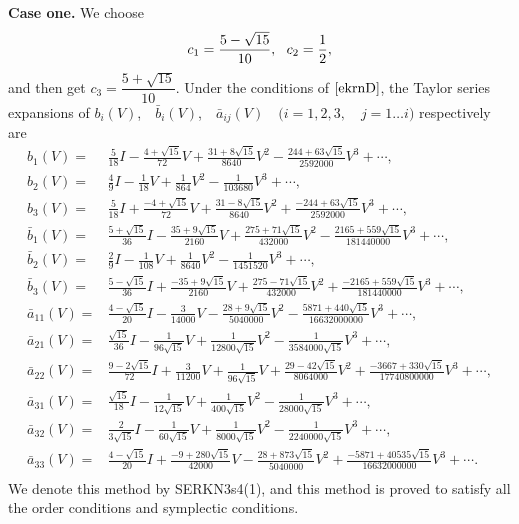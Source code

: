 \documentclass{article}
\begin{document}
\textbf{Case one.}  We choose
\begin{equation}
\begin{array}
[c]{ll}
c_{1}=\dfrac{5-\sqrt{15}}{10},\ \ c_{2}=\dfrac{1}{2},\\
 \end{array}
  \label{ekrnD}%
\end{equation}
and then get $c_{3}=\dfrac{5+\sqrt{15}}{10}$. Under the conditions
of $\eqref{ekrnD}$, the Taylor series expansions of $b_{i}(V)$,\ \
$\bar{b}_{i}(V)$,\ \ $\bar{a}_{ij}(V)$\ \ $(i=1,2,3,$\ \ $j=1\ldots
i)$ respectively are
\begin{equation}
\begin{aligned}
 b_1(V)=&
\frac{5}{18}I - \frac{4+\sqrt{15}}{72} V +
\frac{31+8\sqrt{15}}{8640} V^2 -\frac{244+63\sqrt{15}}{2592000} V^3
+ \cdots,
\\
b_2(V)=&\frac{4}{9}I -\frac{1}{18}V  + \frac{1}{864} V^2
-\frac{1}{103680} V^3   +\cdots,
\\
b_3(V)=& \frac{5}{18}I  + \frac{-4+\sqrt{15}}{72} V +
\frac{31-8\sqrt{15}}{8640}V^2 +\frac{-244+63\sqrt{15}}{2592000} V^3  +\cdots,\\
 \bar{b}_1(V)=&
 \frac{5+\sqrt{15}}{36}I - \frac{35+9\sqrt{15}}{2160}
  V + \frac{275+71\sqrt{15}}{432000} V^2 - \frac{2165+559\sqrt{15}}{181440000} V^3  +\cdots
,\\
 \bar{b}_2(V)=&
 \frac{2}{9}I -\frac{1}{108}
  V + \frac{1}{8640} V^2 - \frac{1}{1451520} V^3  +\cdots
,\\
 \bar{b}_3(V)=&
 \frac{5-\sqrt{15}}{36}I + \frac{-35+9\sqrt{15}}{2160}
  V + \frac{275-71\sqrt{15}}{432000} V^2 + \frac{-2165+559\sqrt{15}}{181440000} V^3  +\cdots
,\\
\bar{a}_{11}(V)=& \frac{4-\sqrt{15}}{20}I -\frac{3}{14000}V  -
\frac{28+9\sqrt{15}}{5040000} V^2
-\frac{5871+440\sqrt{15}}{16632000000}V^3 +\cdots
,\\
\bar{a}_{21}(V)=& \frac{\sqrt{15}}{36}I -\frac{1}{96\sqrt{15}}V
+\frac{1}{12800\sqrt{15}}V^2 -\frac{1}{3584000\sqrt{15}}V^3   +
\cdots
,\\
\bar{a}_{22}(V)=& \frac{9-2\sqrt{15}}{72}I
+\frac{3}{11200}V+\frac{1}{96\sqrt{15}}V +
\frac{29-42\sqrt{15}}{8064000}V^2 +
\frac{-3667+330\sqrt{15}}{17740800000}V^3  +\cdots
,\\
\bar{a}_{31}(V)=& \frac{\sqrt{15}}{18}I -\frac{1}{12\sqrt{15}}V
+\frac{1}{400\sqrt{15}}V^2 -\frac{1}{28000\sqrt{15}}V^3
 +\cdots
,\\
\bar{a}_{32}(V)=& \frac{2}{3\sqrt{15}}I -\frac{1}{60\sqrt{15}}V
+\frac{1}{8000\sqrt{15}}V^2 -\frac{1}{2240000\sqrt{15}}V^3 +\cdots
,\\
\bar{a}_{33}(V)=& \frac{4-\sqrt{15}}{20}I
+\frac{-9+280\sqrt{15}}{42000}V -\frac{28+873\sqrt{15}}{5040000}V^2
+\frac{-5871+40535\sqrt{15}}{16632000000}V^3  +\cdots
.\\
\end{aligned}
\end{equation}
We denote this method by SERKN3s4(1), and this method is proved to
satisfy all the order conditions and symplectic conditions.
\end{document}
